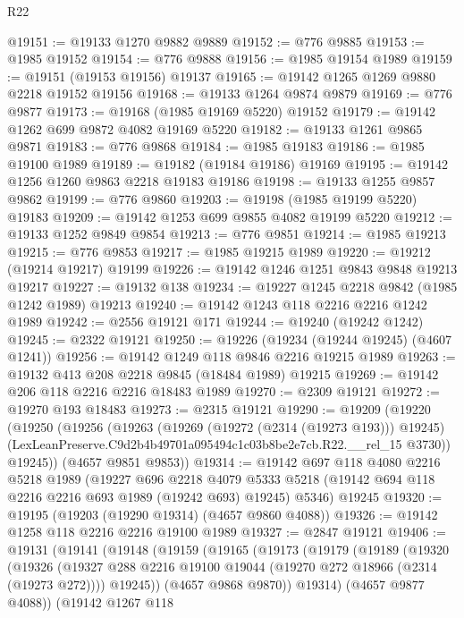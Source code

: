 \begin{lexlean}{R22}
\begin{coremodule}
@19151 := @19133 @1270 @9882 @9889
@19152 := @776 @9885
@19153 := @1985 @19152
@19154 := @776 @9888
@19156 := @1985 @19154 @1989
@19159 := @19151 (@19153 @19156) @19137
@19165 := @19142 @1265 @1269 @9880 @2218 @19152 @19156
@19168 := @19133 @1264 @9874 @9879
@19169 := @776 @9877
@19173 := @19168 (@1985 @19169 @5220) @19152
@19179 := @19142 @1262 @699 @9872 @4082 @19169 @5220
@19182 := @19133 @1261 @9865 @9871
@19183 := @776 @9868
@19184 := @1985 @19183
@19186 := @1985 @19100 @1989
@19189 := @19182 (@19184 @19186) @19169
@19195 := @19142 @1256 @1260 @9863 @2218 @19183 @19186
@19198 := @19133 @1255 @9857 @9862
@19199 := @776 @9860
@19203 := @19198 (@1985 @19199 @5220) @19183
@19209 := @19142 @1253 @699 @9855 @4082 @19199 @5220
@19212 := @19133 @1252 @9849 @9854
@19213 := @776 @9851
@19214 := @1985 @19213
@19215 := @776 @9853
@19217 := @1985 @19215 @1989
@19220 := @19212 (@19214 @19217) @19199
@19226 := @19142 @1246 @1251 @9843 @9848 @19213 @19217
@19227 := @19132 @138
@19234 := @19227 @1245 @2218 @9842 (@1985 @1242 @1989) @19213
@19240 := @19142 @1243 @118 @2216 @2216 @1242 @1989
@19242 := @2556 @19121 @171
@19244 := @19240 (@19242 @1242)
@19245 := @2322 @19121
@19250 := @19226 (@19234 (@19244 @19245) (@4607 @1241))
@19256 := @19142 @1249 @118 @9846 @2216 @19215 @1989
@19263 := @19132 @413 @208 @2218 @9845 (@18484 @1989) @19215
@19269 := @19142 @206 @118 @2216 @2216 @18483 @1989
@19270 := @2309 @19121
@19272 := @19270 @193 @18483
@19273 := @2315 @19121
@19290 := @19209
    (@19220
      (@19250
        (@19256
          (@19263
            (@19269 (@19272 (@2314 (@19273 @193))) @19245)
            (LexLeanPreserve.C9d2b4b49701a095494c1c03b8be2e7cb.R22.__rel_15 @3730))
          @19245))
      (@4657 @9851 @9853))
@19314 := @19142
    @697
    @118
    @4080
    @2216
    @5218
    @1989
    (@19227
      @696
      @2218
      @4079
      @5333
      @5218
      (@19142 @694 @118 @2216 @2216 @693 @1989 (@19242 @693) @19245)
      @5346)
    @19245
@19320 := @19195 (@19203 (@19290 @19314) (@4657 @9860 @4088))
@19326 := @19142 @1258 @118 @2216 @2216 @19100 @1989
@19327 := @2847 @19121
@19406 := @19131
    (@19141
      (@19148
        (@19159
          (@19165
            (@19173
              (@19179
                (@19189
                  (@19320
                    (@19326
                      (@19327 @288 @2216 @19100 @19044 (@19270 @272 @18966 (@2314 (@19273 @272))))
                      @19245))
                  (@4657 @9868 @9870))
                @19314)
              (@4657 @9877 @4088))
            (@19142
              @1267
              @118

\end{coremodule}
\end{lexlean}
